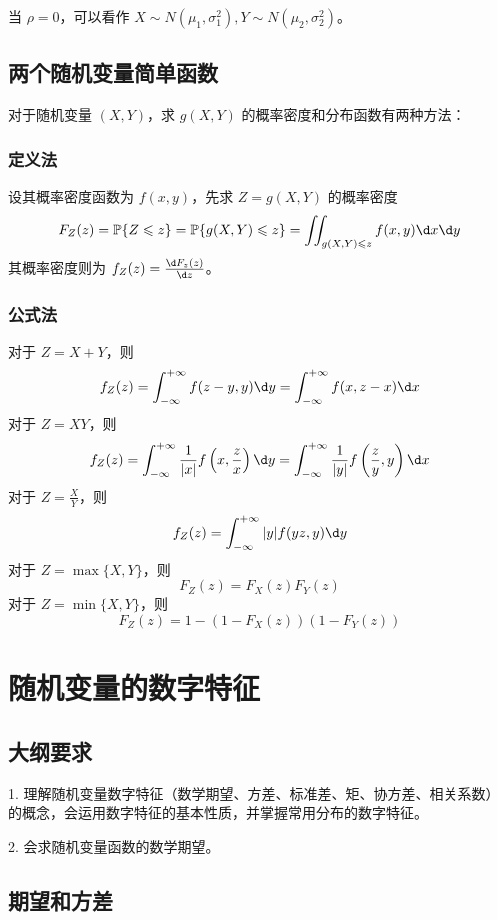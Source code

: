当 $\rho = 0$，可以看作 $X \sim N(\mu_1, \sigma_1^2), Y \sim N(\mu_2, \sigma_2^2)$。

\subsection{两个随机变量简单函数}

对于随机变量 $(X, Y)$，求 $g(X, Y)$ 的概率密度和分布函数有两种方法：

\subsubsection*{定义法}

设其概率密度函数为 $f(x, y)$，先求 $Z = g(X, Y)$ 的概率密度
\[ F_Z(z) = \bbP\{Z \leqslant z\} = \bbP\{g(X,Y) \leqslant z\} = \iint_{g(X,Y) \leqslant z} f(x, y) \d x \d y \]
其概率密度则为 $f_Z(z) = \frac{\d F_z(z)}{\d z}$。

\subsubsection*{公式法}

对于 $Z = X + Y$，则
\[ f_Z(z) = \int_{-\infty}^{+\infty} f(z - y, y) \d y = \int_{-\infty}^{+\infty} f(x, z - x) \d x \]
对于 $Z = XY$，则
\[ f_Z(z) = \int_{-\infty}^{+\infty} \frac{1}{|x|}f\left(x, \frac{z}{x}\right) \d y = \int_{-\infty}^{+\infty} \frac{1}{|y|}f\left(\frac{z}{y}, y\right) \d x \]
对于 $Z = \frac{X}{Y}$，则
\[ f_Z(z) = \int_{-\infty}^{+\infty} |y|f(yz, y) \d y \]
对于 $Z = \max\{X, Y\}$，则
\[ F_Z(z) = F_X(z)F_Y(z) \]
对于 $Z = \min\{X, Y\}$，则
\[ F_Z(z) = 1 - (1 - F_X(z))(1 - F_Y(z)) \]

\section{随机变量的数字特征}

\subsection{大纲要求}

1. 理解随机变量数字特征（数学期望、方差、标准差、矩、协方差、相关系数）的概念，会运用数字特征的基本性质，并掌握常用分布的数字特征。

2. 会求随机变量函数的数学期望。

\subsection{期望和方差}

